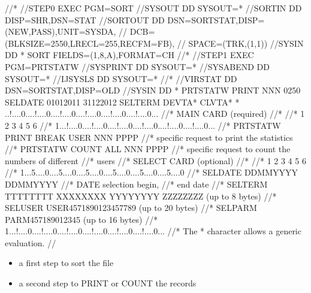 \documentclass[letterpaper,10pt,english]{sphinxmanual}
\begin{document}
\begin{sphinxVerbatim}[commandchars=\\\{\}]
//*
//STEP0 EXEC PGM=SORT
//SYSOUT DD SYSOUT=*
//SORTIN DD DISP=SHR,DSN=\PYGZam{}STAT
//SORTOUT DD DSN=\PYGZam{}\PYGZam{}SORTSTAT,DISP=(NEW,PASS),UNIT=SYSDA,
// DCB=(BLKSIZE=2550,LRECL=255,RECFM=FB),
// SPACE=(TRK,(1,1))
//SYSIN DD *
SORT FIELDS=(1,8,A),FORMAT=CH
//*
//STEP1 EXEC PGM=PRTSTATW
//SYSPRINT DD SYSOUT=*
//SYSABEND DD SYSOUT=*
//IJSYSLS DD SYSOUT=*
//*
//VIRSTAT DD DSN=\PYGZam{}\PYGZam{}SORTSTAT,DISP=OLD
//SYSIN DD *
PRTSTATW PRINT NNN 0250
SELDATE 01012011 31122012
SELTERM DEVTA* CLVTA*
* ..!....0....!....0....!....0....!....0....!....0....!....0...
//* MAIN CARD (required)
//* \PYGZhy{}\PYGZhy{}\PYGZhy{}\PYGZhy{}\PYGZhy{}\PYGZhy{}\PYGZhy{}\PYGZhy{}\PYGZhy{}
//* 1 2 3 4 5 6
//* 1...!....0....!....0....!....0....!....0....!....0....!....0...
//* PRTSTATW PRINT BREAK USER NNN PPPP
//* specific request to print the statistics
//* PRTSTATW COUNT \PYGZdl{}ALL\PYGZdl{} NNN PPPP
//* specific request to count the numbers of different
//* users
//* SELECT CARD (optional)
//* \PYGZhy{}\PYGZhy{}\PYGZhy{}\PYGZhy{}\PYGZhy{}\PYGZhy{}\PYGZhy{}\PYGZhy{}\PYGZhy{}\PYGZhy{}\PYGZhy{}
//* 1 2 3 4 5 6
//* 1...5....0....5....0....5....0....5....0....5....0....5....0
//* SELDATE DDMMYYYY DDMMYYYY
//* DATE selection begin,
//* end date
//* SELTERM TTTTTTTT XXXXXXXX YYYYYYYY ZZZZZZZZ (up to 8 bytes)
//* SELUSER USER4571890123457789 (up to 20 bytes)
//* SELPARM PARM457189012345 (up to 16 bytes)
//* 1...!....0....!....0....!....0....!....0....!....0....!....0...
//* The \PYGZsq{}*\PYGZsq{} character allows a generic evaluation.
//
\end{sphinxVerbatim}

\sphinxAtStartPar
{}
\begin{description}
\begin{itemize}
\item {} 
\sphinxAtStartPar
a first step to sort the file

\item {} 
\sphinxAtStartPar
a second step to PRINT or COUNT the records

\end{itemize}

\end{description}

\newpage

\ignorespaces 
\end{document}
